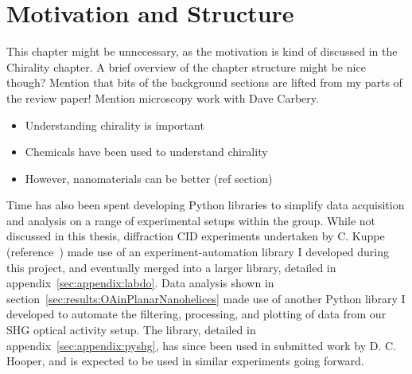 \chapter{Motivation and Structure}\label{sec:background:Introduction}
\color{red}
This chapter might be unnecessary, as the motivation is kind of discussed in the Chirality chapter. A brief overview of the chapter structure might be nice though?
Mention that bits of the background sections are lifted from my parts of the review paper! Mention microscopy work with Dave Carbery.

\begin{itemize}
    \item Understanding chirality is important
    \item Chemicals have been used to understand chirality
    \item However, nanomaterials can be better (ref section)
\end{itemize}
\color{black}

Time has also been spent developing Python libraries to simplify data acquisition and analysis on a range of experimental setups within the group. While not discussed in this thesis, diffraction CID experiments undertaken by C. Kuppe (reference~\cite{Kuppe2018}) made use of an experiment-automation library I developed during this project, and eventually merged into a larger library, detailed in appendix~\ref{sec:appendix:labdo}. Data analysis shown in section~\ref{sec:results:OAinPlanarNanohelices} made use of another Python library I developed to automate the filtering, processing, and plotting of data from our SHG optical activity setup. The library, detailed in appendix~\ref{sec:appendix:pyshg}, has since been used in submitted work by D. C. Hooper, and is expected to be used in similar experiments going forward.